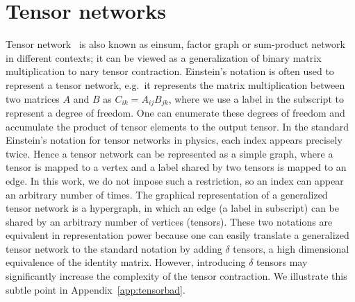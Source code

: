 \documentclass[onefignum, onetabnum]{siamart190516}
\newcommand{\<}{\langle}
\renewcommand{\>}{\rangle}
\newcommand{\App}[1]{Appendix~\ref{#1}}
\begin{document}
\section{Tensor networks}
Tensor network~\cite{Cirac2020, Orus2014} is also known as einsum, factor graph or sum-product network~\cite{Bishop2006} in different contexts;
it can be viewed as a generalization of binary matrix multiplication to nary tensor contraction.
Einstein's notation is often used to represent a tensor network, e.g.\ it represents the matrix multiplication between two matrices $A$ and $B$ as $C_{ik} = A_{ij}B_{jk}$,
where we use a label in the subscript to represent a degree of freedom.
One can enumerate these degrees of freedom and accumulate the product of tensor elements to the output tensor.
In the standard Einstein's notation for tensor networks in physics, each index appears precisely twice.
Hence a tensor network can be represented as a simple graph,
where a tensor is mapped to a vertex and a label shared by two tensors is mapped to an edge.
In this work, we do not impose such a restriction, so an index can appear an arbitrary number of times. 
The graphical representation of a generalized tensor network is a hypergraph, in which an edge (a label in subscript) can be shared by an arbitrary number of vertices (tensors).
These two notations are equivalent in representation power because one can easily translate a generalized tensor network to the standard notation by adding $\delta$ tensors, a high dimensional equivalence of the identity matrix.
However, introducing $\delta$ tensors may significantly increase the complexity of the tensor contraction. We illustrate this subtle point in \App{app:tensorbad}.
\end{document}

